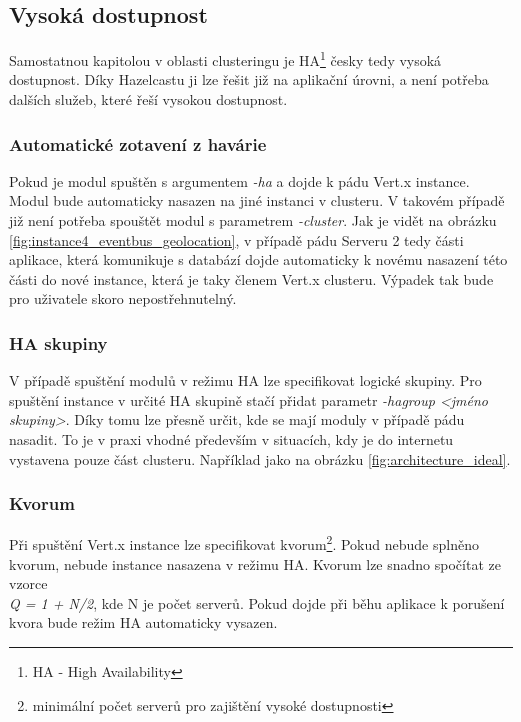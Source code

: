 \subsection{Vysoká dostupnost}

Samostatnou kapitolou v oblasti clusteringu je HA\footnote{HA - High Availability} česky tedy vysoká dostupnost. Díky Hazelcastu ji lze řešit již na aplikační úrovni, a není potřeba  dalších služeb, které řeší vysokou dostupnost.

\subsubsection{Automatické zotavení z havárie}

Pokud je modul spuštěn s argumentem \emph{-ha} a dojde k pádu Vert.x instance. Modul bude automaticky nasazen na jiné instanci v clusteru. V takovém případě již není potřeba spouštět modul s parametrem \emph{-cluster}. Jak je vidět na obrázku \ref{fig:instance4_eventbus_geolocation}, v případě pádu Serveru 2 tedy části aplikace, která komunikuje s databází dojde automaticky k novému nasazení této části do nové instance, která je taky členem Vert.x clusteru. Výpadek tak bude pro uživatele skoro nepostřehnutelný.

\subsubsection{HA skupiny}

V případě spuštění modulů v režimu HA lze specifikovat logické skupiny. Pro spuštění instance v určité HA skupině stačí přidat parametr \emph{-hagroup <jméno skupiny>}. Díky tomu lze přesně určit, kde se mají moduly v případě pádu nasadit. To je v praxi vhodné především v situacích, kdy je do internetu vystavena pouze část clusteru. Například jako na obrázku \ref{fig:architecture_ideal}.

\subsubsection{Kvorum}

Při spuštění Vert.x instance lze specifikovat kvorum\footnote{minimální počet serverů pro zajištění vysoké dostupnosti}. Pokud nebude splněno kvorum, nebude instance nasazena v režimu HA. Kvorum lze snadno spočítat ze vzorce \\ \emph{Q = 1 + N/2}, kde N je počet serverů. Pokud dojde při běhu aplikace k porušení kvora bude režim HA automaticky vysazen.

